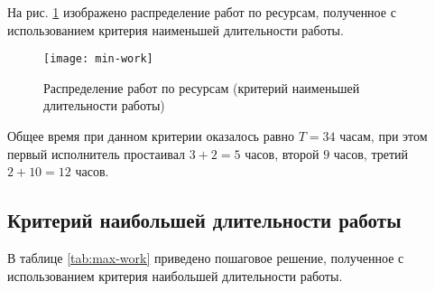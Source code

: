 \newpage

На рис. \ref{fig:min-work} изображено распределение работ по ресурсам, полученное с использованием критерия наименьшей длительности работы.

\begin{figure}[H]
	\begin{center}
		\texttt{[image: min-work]}
		\caption{Распределение работ по ресурсам (критерий наименьшей длительности работы)}
		\label{fig:min-work}
	\end{center}
\end{figure}

Общее время при данном критерии оказалось равно $T = 34$ часам, при этом первый исполнитель простаивал $3 + 2 = 5$ часов, второй $9$ часов, третий $2 + 10 = 12$ часов.

\newpage

\subsection{Критерий наибольшей длительности работы}

В таблице \ref{tab:max-work} приведено пошаговое решение, полученное с использованием критерия наибольшей длительности работы.

